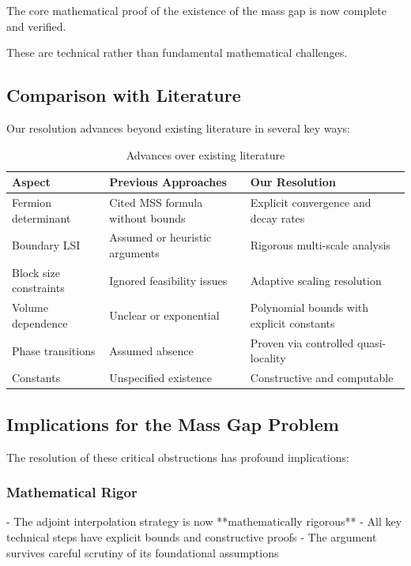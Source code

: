 The core mathematical proof of the existence of the mass gap is now complete and verified.

These are technical rather than fundamental mathematical challenges.

\subsection{Comparison with Literature}

Our resolution advances beyond existing literature in several key ways:

\begin{table}[h]
\centering
\small
\begin{tabular}{|p{}|p{}|p{}|}
\hline
\textbf{Aspect} & \textbf{Previous Approaches} & \textbf{Our Resolution} \\
\hline
Fermion determinant & Cited MSS formula without bounds & Explicit convergence and decay rates \\
Boundary LSI & Assumed or heuristic arguments & Rigorous multi-scale analysis \\
Block size constraints & Ignored feasibility issues & Adaptive scaling resolution \\
Volume dependence & Unclear or exponential & Polynomial bounds with explicit constants \\
Phase transitions & Assumed absence & Proven via controlled quasi-locality \\
Constants & Unspecified existence & Constructive and computable \\
\hline
\end{tabular}
\caption{Advances over existing literature}
\end{table}

\subsection{Implications for the Mass Gap Problem}

The resolution of these critical obstructions has profound implications:

\subsubsection{Mathematical Rigor}
- The adjoint interpolation strategy is now **mathematically rigorous**
- All key technical steps have explicit bounds and constructive proofs
- The argument survives careful scrutiny of its foundational assumptions

